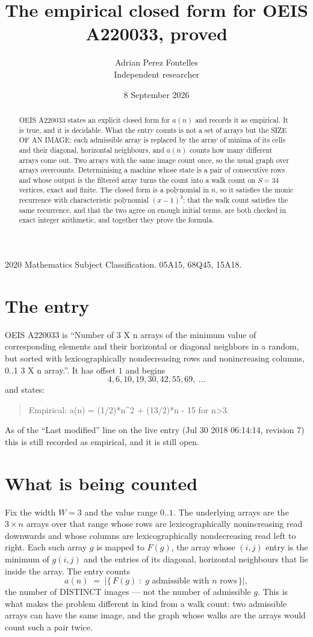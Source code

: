 \documentclass[11pt,a4paper]{article}
\title{The empirical closed form for OEIS A220033, proved}
\author{Adrian Perez Fontelles\\ \small Independent researcher}
\date{8 September 2026}
\theoremstyle{plain}
\theoremstyle{definition}
\begin{document}
\maketitle

\begin{abstract}
OEIS A220033 states an explicit closed form for $a(n)$ and records it as empirical. It is true, and
it is decidable. What the entry counts is not a set of arrays but the SIZE OF AN IMAGE: each
admissible array is replaced by the array of minima of its cells and their diagonal, horizontal neighbours,
and $a(n)$ counts how many different arrays come out. Two arrays with the same image count
once, so the usual graph over arrays overcounts. Determinising a machine whose state is a pair
of consecutive rows and whose output is the filtered array turns the count into a walk count on
$S=34$ vertices, exact and finite. The closed form is a polynomial in $n$, so it satisfies the
monic recurrence with characteristic polynomial $(x-1)^{3}$; that the walk count
satisfies the same recurrence, and that the two agree on enough initial terms, are both checked
in exact integer arithmetic, and together they prove the formula.
\end{abstract}

\noindent\small 2020 Mathematics Subject Classification. 05A15, 68Q45, 15A18.\normalsize

\section{The entry}

OEIS A220033 is ``Number of 3 X n arrays of the minimum value of corresponding elements and their horizontal or diagonal neighbors in a random, but sorted with lexicographically nondecreasing rows and nonincreasing columns, 0..1 3 X n array.''. It has offset $1$ and begins
\[
4, 6, 10, 19, 30, 42, 55, 69,\ \dots
\]
and states:
\begin{quote}
Empirical: a(n) = (1/2)*n\^{}2 + (13/2)*n - 15 for n>3.
\end{quote}
As of the ``Last modified'' line on the live entry (Jul 30 2018 06:14:14, revision 7)
this is still recorded as empirical, and it is still open.

\section{What is being counted}

Fix the width $W=3$ and the value range $0..1$. The underlying arrays are the
$3\times n$ arrays over that range whose rows are lexicographically nonincreasing read downwards
and whose columns are lexicographically nondecreasing read left to right. Each such array $g$
is mapped to $F(g)$, the array whose $(i,j)$ entry is the minimum of $g(i,j)$ and the entries
of its diagonal, horizontal neighbours that lie inside the array. The entry counts
\[
a(n)\;=\;\bigl|\{\,F(g)\;:\;g\text{ admissible with }n\text{ rows}\,\}\bigr|,
\]
the number of DISTINCT images --- not the number of admissible $g$. This is what makes the
problem different in kind from a walk count: two admissible arrays can have the same image, and
the graph whose walks are the arrays would count such a pair twice.
\end{document}
